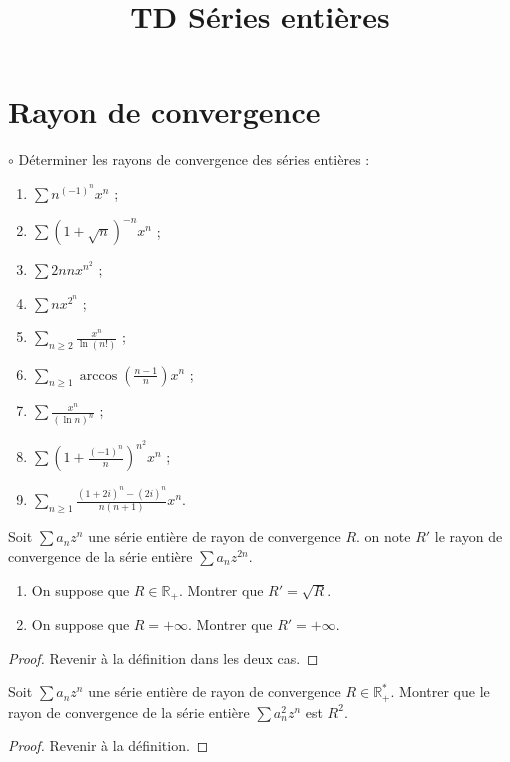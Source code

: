 \documentclass[french,a4paper]{article}
\title{TD Séries entières}
\newcommand{\R}{\mathbb{R}}
\newcommand{\st}{^*}
\theoremstyle{plain}
\theoremstyle{definition}
\theoremstyle{remark}
\begin{document}
\maketitle

\section{Rayon de convergence}

\begin{ex}[Moulin.SE.01]{$\circ$}
	Déterminer les rayons de convergence des séries entières :
	\begin{enumerate}
		\item $\displaystyle\sum n^{(-1)^n}x^n$ ;
		\item $\displaystyle\sum (1+\sqrt{n})^{-n}x^n$ ;
		\item $\displaystyle\sum 2nnx^{n^2}$ ;
		\item $\displaystyle\sum nx^{2^n}$ ;
		\item $\displaystyle\sum_{n\geqslant 2} \frac{x^n}{\ln(n!)}$ ;
		\item $\displaystyle\sum_{n\geqslant 1} \arccos\left(\frac{n-1}{n}\right)x^n$ ;
		\item $\displaystyle\sum \frac{x^n}{(\ln n)^n}$ ;
		\item $\displaystyle\sum \left(1+\frac{(-1)^n}{n}\right)^{n^2}x^n$ ;
		\item $\displaystyle\sum_{n\geqslant 1} \frac{(1+2i)^n-(2i)^n}{n(n+1)}x^n$.
	\end{enumerate}
\end{ex}

\begin{ex}[Moulin.SE.02]{}
	Soit $\sum a_nz^n$ une série entière de rayon de convergence $R$. on note $R'$ le rayon de convergence de la série entière $\sum a_nz^{2n}$.
	\begin{enumerate}
		\item On suppose que $R\in\R_+$. Montrer que $R'=\sqrt{R}$.
		\item On suppose que $R=+\infty$. Montrer que $R'=+\infty$.
	\end{enumerate}
\end{ex}
\begin{proof}
	Revenir à la définition dans les deux cas.
\end{proof}

\begin{ex}[Moulin.SE.03]{}
	Soit $\sum a_nz^n$ une série entière de rayon de convergence $R\in\R_+\st$. Montrer que le rayon de convergence de la série entière $\sum a_n^2z^n$ est $R^2$.
\end{ex}
\begin{proof}
	Revenir à la définition.
\end{proof}
\end{document}
